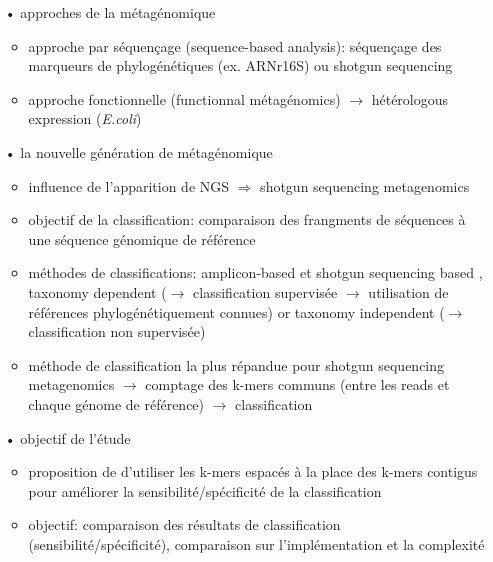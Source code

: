 \begin{itemize}
        \item[•] approches de la métagénomique
          \begin{itemize}
          \item approche par séquençage (sequence-based analysis): séquençage des marqueurs de phylogénétiques (ex. ARNr16S) ou shotgun sequencing
          \item approche fonctionnelle (functionnal métagénomics) $\rightarrow$ hétérologous expression (\textit{E.coli})
          \end{itemize}
          
        \item[•] la nouvelle génération de métagénomique
          \begin{itemize}
          \item influence de l'apparition de NGS $\Rightarrow$ shotgun sequencing metagenomics
          \item objectif de la classification: comparaison des frangments de séquences à une séquence génomique de référence
          \item méthodes de classifications: amplicon-based et shotgun sequencing based \cite{Mande2012}, taxonomy dependent ($\rightarrow$ classification supervisée $\rightarrow$ utilisation de références phylogénétiquement connues) or taxonomy independent ($\rightarrow$ classification non supervisée)
          \item méthode de classification la plus répandue pour shotgun sequencing metagenomics $\rightarrow$ comptage des k-mers communs (entre les reads et chaque génome de référence) $\rightarrow$ classification
          \end{itemize}

        \item[•] objectif de l'étude
          \begin{itemize}
            \item proposition de \cite{Brinda2015} d'utiliser les k-mers espacés à la place des k-mers contigus pour améliorer la sensibilité/spécificité de la classification
            \item objectif: comparaison des résultats de classification (sensibilité/spécificité), comparaison sur l'implémentation et la complexité
          \end{itemize}
	\end{itemize}
